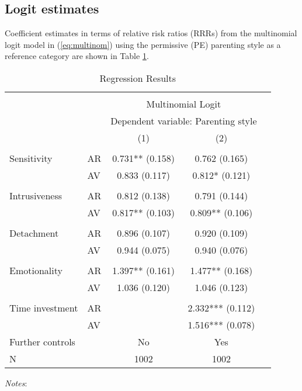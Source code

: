 \subsection{Logit estimates}
Coefficient estimates in terms of relative risk ratios (RRRs) from the multinomial logit model in (\ref{eq:multinom}) using the permissive (PE) parenting style as a reference category are shown in Table \ref{tab:res}.  
%
\begin{table}[!htbp]
	\centering
	\begin{threeparttable}
		\caption{Regression Results}
		\label{tab:res}
		\begin{tabular}[t]{llccc}
			\hline \hline \\[-1.8ex]
			&    &  \multicolumn{2}{c}{Multinomial Logit}\\
			&    &  \multicolumn{2}{c}{Dependent variable: Parenting style}\\
			&    & (1) & (2) \\
			\cline{3-4} \\[-1.8ex]
			Sensitivity & AR & 0.731** (0.158) & 0.762 (0.165)\\
			& AV & 0.833 (0.117) & 0.812* (0.121)\\
			&  &  \vphantom{4} & \\
			Intrusiveness & AR & 0.812 (0.138) & 0.791 (0.144)\\
			& AV & 0.817** (0.103) & 0.809** (0.106)\\
			&  &  \vphantom{3} & \\
			Detachment & AR & 0.896 (0.107) & 0.920 (0.109)\\
			& AV & 0.944 (0.075) & 0.940 (0.076)\\
			&  &  \vphantom{2} & \\
			Emotionality & AR & 1.397** (0.161) & 1.477** (0.168)\\
			& AV & 1.036 (0.120) & 1.046 (0.123)\\
			&  &  \vphantom{1} & \\
			Time investment & AR &  & 2.332*** (0.112)\\
			& AV &  & 1.516*** (0.078)\\
			\midrule
			Further controls &  & No & Yes\\
			N &  & 1002 & 1002\\
			\bottomrule
		\end{tabular}
		\begin{tablenotes}
			\small
			\item \textit{Notes}: 
		\end{tablenotes}
	\end{threeparttable}
\end{table}
